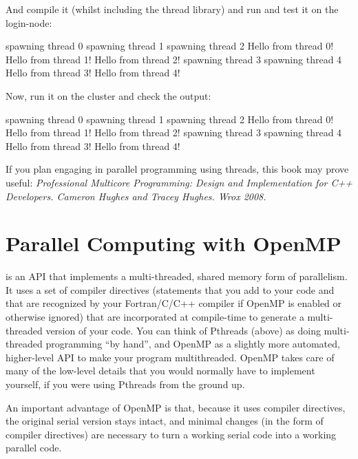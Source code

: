 And compile it (whilst including the thread library) and run and test it on the login-node:

\begin{prompt}
spawning thread 0
spawning thread 1
spawning thread 2
Hello from thread 0!
Hello from thread 1!
Hello from thread 2!
spawning thread 3
spawning thread 4
Hello from thread 3!
Hello from thread 4!
\end{prompt}

Now, run it on the cluster and check the output:

\begin{prompt}
spawning thread 0
spawning thread 1
spawning thread 2
Hello from thread 0!
Hello from thread 1!
Hello from thread 2!
spawning thread 3
spawning thread 4
Hello from thread 3!
Hello from thread 4!
\end{prompt}

\begin{tip}
If you plan engaging in parallel programming using threads,
this book may prove useful: \emph{Professional Multicore Programming: Design
and Implementation for C++ Developers. Cameron Hughes and Tracey Hughes. Wrox
2008.}
\end{tip}

\section{Parallel Computing with OpenMP}

 is an API that implements a multi-threaded, shared
memory form of parallelism. It uses a set of compiler directives (statements
that you add to your code and that are recognized by your Fortran/C/C++
compiler if OpenMP is enabled or otherwise ignored) that are incorporated at
compile-time to generate a multi-threaded version of your code. You can think
of Pthreads (above) as doing multi-threaded programming ``by hand'', and OpenMP
as a slightly more automated, higher-level API to make your program
multithreaded. OpenMP takes care of many of the low-level details that you
would normally have to implement yourself, if you were using Pthreads from the
ground up.

An important advantage of OpenMP is that, because it uses compiler directives,
the original serial version stays intact, and minimal changes (in the form of
compiler directives) are necessary to turn a working serial code into a working
parallel code.

